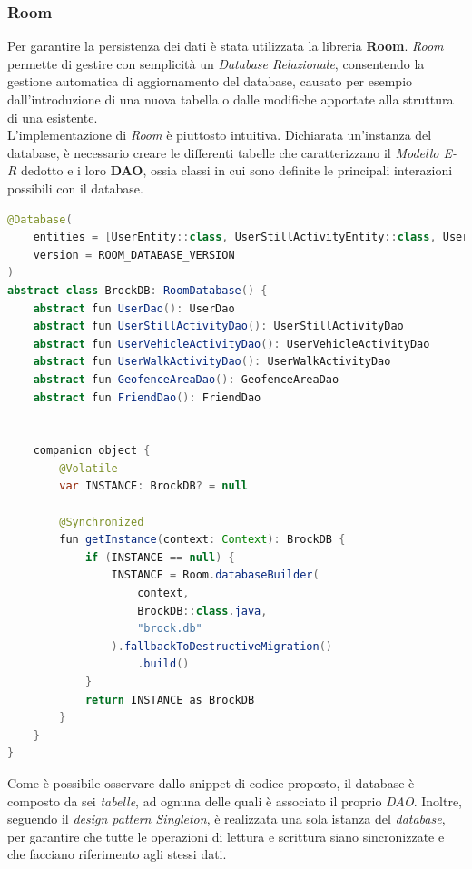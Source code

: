 \documentclass{article}
\begin{document}
    \subsubsection*{Room}
    Per garantire la persistenza dei dati è stata utilizzata la libreria \textbf{Room}. \textit{Room} permette di gestire con semplicità un \textit{Database Relazionale}, consentendo la gestione automatica di aggiornamento del database, causato per esempio dall'introduzione di una nuova tabella o dalle modifiche apportate alla struttura di una esistente. \vspace*{7pt}\\
    L'implementazione di \textit{Room} è piuttosto intuitiva. Dichiarata un'instanza del database, è necessario creare le differenti tabelle che caratterizzano il \textit{Modello E-R} dedotto e i loro \textbf{DAO}, ossia classi in cui sono definite le principali interazioni possibili con il database.
    \begin{lstlisting}[language = JAVA]
@Database(
    entities = [UserEntity::class, UserStillActivityEntity::class, UserVehicleActivityEntity::class, UserWalkActivityEntity::class, GeofenceAreaEntry::class, FriendEntity::class],
    version = ROOM_DATABASE_VERSION
)
abstract class BrockDB: RoomDatabase() {
    abstract fun UserDao(): UserDao
    abstract fun UserStillActivityDao(): UserStillActivityDao
    abstract fun UserVehicleActivityDao(): UserVehicleActivityDao
    abstract fun UserWalkActivityDao(): UserWalkActivityDao
    abstract fun GeofenceAreaDao(): GeofenceAreaDao
    abstract fun FriendDao(): FriendDao


    companion object {
        @Volatile
        var INSTANCE: BrockDB? = null

        @Synchronized
        fun getInstance(context: Context): BrockDB {
            if (INSTANCE == null) {
                INSTANCE = Room.databaseBuilder(
                    context,
                    BrockDB::class.java,
                    "brock.db"
                ).fallbackToDestructiveMigration()
                    .build()
            }
            return INSTANCE as BrockDB
        }
    }
}
    \end{lstlisting}
    Come è possibile osservare dallo snippet di codice proposto, il database è composto da sei \textit{tabelle}, ad ognuna delle quali è associato il proprio \textit{DAO}.
    Inoltre, seguendo il \textit{design pattern Singleton}, è realizzata una sola istanza del \textit{database}, per garantire che tutte le operazioni di lettura e scrittura siano sincronizzate e che facciano riferimento agli stessi dati.
\end{document}
